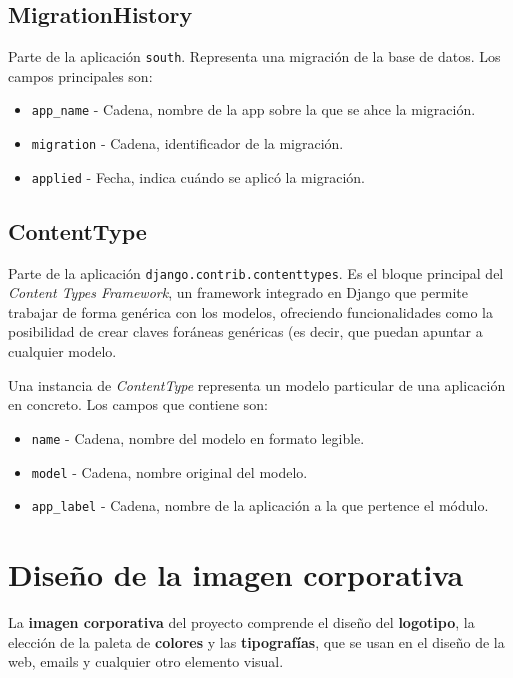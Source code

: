 \subsection{MigrationHistory}

Parte de la aplicación \texttt{south}. Representa una migración de la base de
datos. Los campos principales son:

\begin{itemize}
\item \texttt{app\_name} - Cadena, nombre de la app sobre la que se ahce la migración.
\item \texttt{migration} - Cadena, identificador de la migración.
\item \texttt{applied} - Fecha, indica cuándo se aplicó la migración.
\end{itemize}

\subsection{ContentType}

Parte de la aplicación \texttt{django.contrib.contenttypes}. Es el bloque
principal del \textit{Content Types Framework}, un framework integrado en Django
que permite trabajar de forma genérica con los modelos, ofreciendo
funcionalidades como la posibilidad de crear claves foráneas genéricas (es
decir, que puedan apuntar a cualquier modelo. 

Una instancia de \textit{ContentType} representa un modelo particular de una
aplicación en concreto. Los campos que contiene son:

\begin{itemize}
\item \texttt{name} - Cadena, nombre del modelo en formato legible.
\item \texttt{model} - Cadena, nombre original del modelo.
\item \texttt{app\_label} - Cadena, nombre de la aplicación a la que pertence el
  módulo.
\end{itemize}

\section{Diseño de la imagen corporativa}

La \textbf{imagen corporativa} del proyecto comprende el diseño del
\textbf{logotipo}, la elección de la paleta de \textbf{colores} y las
\textbf{tipografías}, que se usan en el diseño de la web, emails y cualquier
otro elemento visual.

